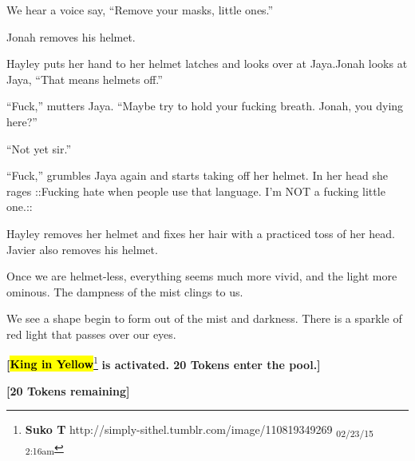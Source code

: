 We hear a voice say, ``Remove your masks, little ones.''

Jonah removes his helmet.

Hayley puts her hand to her helmet latches and looks over at Jaya.Jonah looks at Jaya, ``That means helmets off.''

``Fuck,'' mutters Jaya.  ``Maybe try to hold your fucking breath.  Jonah, you dying here?''

``Not yet sir.''

``Fuck,'' grumbles Jaya again and starts taking off her helmet.  In her head she rages  {\color[RGB]{255,0,0}::Fucking hate when people use that language.  I'm NOT a fucking little one.::} 

Hayley removes her helmet and fixes her hair with a practiced toss of her head.  Javier also removes his helmet.



Once we are helmet-less, everything seems much more vivid, and the light more ominous.   The dampness of the mist clings to us.



We see a shape begin to form out of the mist and darkness.  There is a sparkle of red light that passes over our eyes.



\textbf{{[}}\textbf{\hl{King in Yellow}}\footnote{\textbf{Suko T }http://simply-sithel.tumblr.com/image/110819349269 \textsubscript{02/23/15 2:16am}}\textbf{ is activated.  20 Tokens enter the pool.{]}}



\textbf{{[}20 Tokens remaining{]}}






